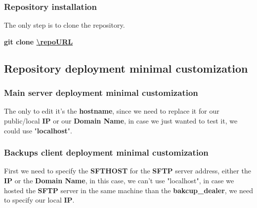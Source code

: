 \subsubsection{Repository installation}\label{subsubsec:repo-installation}
\begin{flushleft}
    The only step is to clone the repository.
    \begin{flushleft}
        \textbf{git clone \url{\repoURL}}
    \end{flushleft}
\end{flushleft}




\subsection{Repository deployment minimal customization}\label{subsec:repo-customization}
\subsubsection[Main server deployment minimal customization]{Main server deployment minimal customization}

\begin{flushleft}
    The only to edit it's the \textbf{hostname}, since we need to replace it for our public/local \textbf{IP}
    or our \textbf{Domain Name}, in case we just wanted to test it, we could use "\textbf{localhost}".
\end{flushleft}

\newpage
\subsubsection[Backups client deployment minimal customization]{Backups client deployment minimal customization}
\begin{flushleft}
    
    
    First we need to specify the \textbf{SFTHOST} for the \textbf{SFTP} server address, either the \textbf{IP} or the
    \textbf{Domain Name}, in this case, we can't use "localhost", in case we hosted the \textbf{SFTP} server in the same machine
    than the \textbf{bakcup\_dealer}, we need to specify our local \textbf{IP}.
\end{flushleft}


